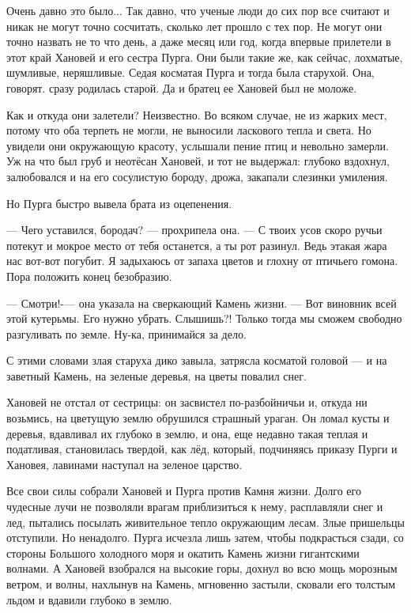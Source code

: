 \documentclass[oneside,final,14pt]{extreport}
\begin{document}
	Очень давно это было... Так давно, что ученые люди до сих пор все считают и никак не могут точно сосчитать, сколько лет прошло с тех пор. Не могут они точно назвать не то что день, а даже месяц или год, когда впервые прилетели в этот край Хановей и его сестра Пурга. Они были такие же, как сейчас, лохматые, шумливые, неряшливые. Седая косматая Пурга и тогда была старухой. Она, говорят. сразу родилась старой. Да и братец ее Хановей был не моложе.
	
	Как и откуда они залетели? Неизвестно. Во всяком случае, не из жарких мест, потому что оба терпеть не могли, не выносили ласкового тепла и света. Но увидели они окружающую красоту, услышали пение птиц и невольно замерли. Уж на что был груб и неотёсан Хановей, и тот не выдержал: глубоко вздохнул, залюбовался и на его сосулистую бороду, дрожа, закапали слезинки умиления.
	
	Но Пурга быстро вывела брата из оцепенения.
	
	— Чего уставился, бородач? — прохрипела она. — С твоих усов скоро ручьи потекут и мокрое место от тебя останется, а ты рот разинул. Ведь этакая жара нас вот-вот погубит. Я задыхаюсь от запаха цветов и глохну от птичьего гомона. Пора положить конец безобразию.
	
	— Смотри!-— она указала на сверкающий Камень жизни. — Вот виновник всей этой кутерьмы. Его нужно убрать. Слышишь?! Только тогда мы сможем свободно разгуливать по земле. Ну-ка, принимайся за дело.
	
	С этими словами злая старуха дико завыла, затрясла косматой головой — и на заветный Камень, на зеленые деревья, на цветы повалил снег.
	
	Хановей не отстал от сестрицы: он засвистел по-разбойничьи и, откуда ни возьмись, на цветущую землю обрушился страшный ураган. Он ломал кусты и деревья, вдавливал их глубоко в землю, и она, еще недавно такая теплая и податливая, становилась твердой, как лёд, который, подчиняясь приказу Пурги и Хановея, лавинами наступал на зеленое царство.
	
	Все свои силы собрали Хановей и Пурга против Камня жизни. Долго его чудесные лучи не позволяли врагам приблизиться к нему, расплавляли снег и лед, пытались посылать живительное тепло окружающим лесам. Злые пришельцы отступили. Но ненадолго. Пурга исчезла лишь затем, чтобы подкрасться сзади, со стороны Большого холодного моря и окатить Камень жизни гигантскими волнами. А Хановей взобрался на высокие горы, дохнул во всю мощь морозным ветром, и волны, нахлынув на Камень, мгновенно застыли, сковали его толстым льдом и вдавили глубоко в землю.
	
\end{document}
